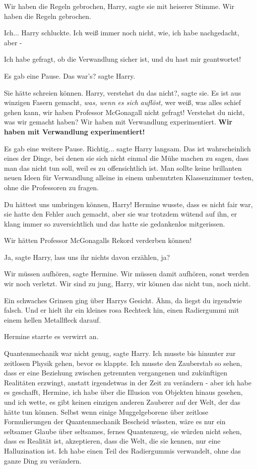 \glqq Wir haben die Regeln gebrochen, Harry\grqq{}, sagte sie mit heiserer
Stimme. \glqq Wir haben die Regeln gebrochen.\grqq{}

\glqq Ich...\grqq{} Harry schluckte. \glqq Ich weiß immer noch nicht, wie, ich
habe nachgedacht, aber -\grqq{}

\glqq Ich habe gefragt, ob die Verwandlung sicher ist, und du hast mir
geantwortet!\grqq{}

Es gab eine Pause. \glqq Das war's?\grqq{} sagte Harry.

Sie hätte schreien können. \glqq Harry, verstehst du das nicht?\grqq{}, sagte
sie. \glqq Es ist aus winzigen Fasern gemacht,\emph{ was, wenn es sich auflöst,
}wer weiß, was alles schief gehen kann, wir haben Professor McGonagall nicht
gefragt! Verstehst du nicht, was wir gemacht haben? Wir haben mit Verwandlung
experimentiert. \textbf{Wir haben mit Verwandlung experimentiert!}\grqq{}

Es gab eine weitere Pause. \glqq Richtig...\grqq{} sagte Harry langsam. \glqq
Das ist wahrscheinlich eines der Dinge, bei denen sie sich nicht einmal die Mühe
machen zu sagen, dass man das nicht tun soll, weil es zu offensichtlich ist. Man
sollte keine brillanten neuen Ideen für Verwandlung alleine in einem unbenutzten
Klassenzimmer testen, ohne die Professoren zu fragen.\grqq{}

\glqq Du hättest uns umbringen können, Harry!\grqq{} Hermine wusste, dass es
nicht fair war, sie hatte den Fehler auch gemacht, aber sie war trotzdem wütend
auf ihn, er klang immer so zuversichtlich und das hatte sie gedankenlos
mitgerissen.

\glqq Wir hätten Professor McGonagalls Rekord verderben können!\grqq{}

\glqq Ja\grqq{}, sagte Harry, \glqq lass uns ihr nichts davon erzählen,
ja?\grqq{}

\glqq Wir müssen aufhören\grqq{}, sagte Hermine. \glqq Wir müssen damit
aufhören, sonst werden wir noch verletzt. Wir sind zu jung, Harry, wir können
das nicht tun, noch nicht.\grqq{}

Ein schwaches Grinsen ging über Harrys Gesicht. \glqq Ähm, da liegst du
irgendwie falsch.\grqq{} Und er hielt ihr ein kleines rosa Rechteck hin, einen
Radiergummi mit einem hellen Metallfleck darauf.

Hermine starrte es verwirrt an.

\glqq Quantenmechanik war nicht genug\grqq{}, sagte Harry. \glqq Ich musste bis
hinunter zur zeitlosen Physik gehen, bevor es klappte. Ich musste den Zauberstab
so sehen, dass er eine Beziehung zwischen getrennten vergangenen und zukünftigen
Realitäten erzwingt, anstatt irgendetwas in der Zeit zu verändern - aber ich
habe es geschafft, Hermine, ich habe über die Illusion von Objekten hinaus
gesehen, und ich wette, es gibt keinen einzigen anderen Zauberer auf der Welt,
der das hätte tun können. Selbst wenn einige Muggelgeborene über zeitlose
Formulierungen der Quantenmechanik Bescheid wüssten, wäre es nur ein seltsamer
Glaube über seltsames, fernes Quantenzeug, sie würden nicht sehen, dass es
Realität ist, akzeptieren, dass die Welt, die sie kennen, nur eine Halluzination
ist. Ich habe einen Teil des Radiergummis verwandelt, ohne das ganze Ding zu
verändern.\grqq{}

